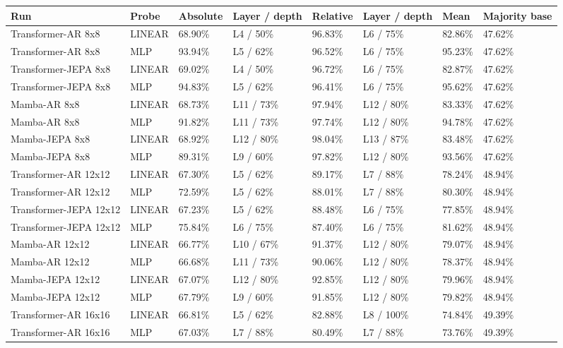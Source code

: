 \begin{table}[t]
\centering
\small
\begin{tabular}{llllllll}
\toprule
Run & Probe & Absolute & Layer / depth & Relative & Layer / depth & Mean & Majority base \\
\midrule
Transformer-AR 8x8 & LINEAR & 68.90\% & L4 / 50\% & 96.83\% & L6 / 75\% & 82.86\% & 47.62\% \\
Transformer-AR 8x8 & MLP & 93.94\% & L5 / 62\% & 96.52\% & L6 / 75\% & 95.23\% & 47.62\% \\
Transformer-JEPA 8x8 & LINEAR & 69.02\% & L4 / 50\% & 96.72\% & L6 / 75\% & 82.87\% & 47.62\% \\
Transformer-JEPA 8x8 & MLP & 94.83\% & L5 / 62\% & 96.41\% & L6 / 75\% & 95.62\% & 47.62\% \\
Mamba-AR 8x8 & LINEAR & 68.73\% & L11 / 73\% & 97.94\% & L12 / 80\% & 83.33\% & 47.62\% \\
Mamba-AR 8x8 & MLP & 91.82\% & L11 / 73\% & 97.74\% & L12 / 80\% & 94.78\% & 47.62\% \\
Mamba-JEPA 8x8 & LINEAR & 68.92\% & L12 / 80\% & 98.04\% & L13 / 87\% & 83.48\% & 47.62\% \\
Mamba-JEPA 8x8 & MLP & 89.31\% & L9 / 60\% & 97.82\% & L12 / 80\% & 93.56\% & 47.62\% \\
Transformer-AR 12x12 & LINEAR & 67.30\% & L5 / 62\% & 89.17\% & L7 / 88\% & 78.24\% & 48.94\% \\
Transformer-AR 12x12 & MLP & 72.59\% & L5 / 62\% & 88.01\% & L7 / 88\% & 80.30\% & 48.94\% \\
Transformer-JEPA 12x12 & LINEAR & 67.23\% & L5 / 62\% & 88.48\% & L6 / 75\% & 77.85\% & 48.94\% \\
Transformer-JEPA 12x12 & MLP & 75.84\% & L6 / 75\% & 87.40\% & L6 / 75\% & 81.62\% & 48.94\% \\
Mamba-AR 12x12 & LINEAR & 66.77\% & L10 / 67\% & 91.37\% & L12 / 80\% & 79.07\% & 48.94\% \\
Mamba-AR 12x12 & MLP & 66.68\% & L11 / 73\% & 90.06\% & L12 / 80\% & 78.37\% & 48.94\% \\
Mamba-JEPA 12x12 & LINEAR & 67.07\% & L12 / 80\% & 92.85\% & L12 / 80\% & 79.96\% & 48.94\% \\
Mamba-JEPA 12x12 & MLP & 67.79\% & L9 / 60\% & 91.85\% & L12 / 80\% & 79.82\% & 48.94\% \\
Transformer-AR 16x16 & LINEAR & 66.81\% & L5 / 62\% & 82.88\% & L8 / 100\% & 74.84\% & 49.39\% \\
Transformer-AR 16x16 & MLP & 67.03\% & L7 / 88\% & 80.49\% & L7 / 88\% & 73.76\% & 49.39\% \\

\end{tabular}
\end{table}
